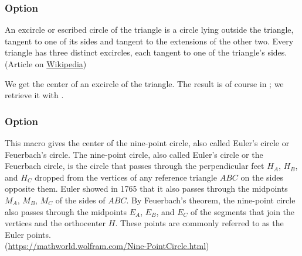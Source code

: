 \begin{tkzexample}[width=0pt,small]
\end{tkzexample}

\subsubsection{Option }
An excircle or escribed circle of the triangle is a circle lying outside the triangle, tangent to one of its sides and tangent to the extensions of the other two. Every triangle has three distinct excircles, each tangent to one of the triangle's sides.\\
(Article on \href{https://en.wikipedia.org/wiki/Incircle_and_excircles_of_a_triangle}{Wikipedia})


 We get the center of an excircle of the triangle. The result is of course in ; we retrieve it with .

\begin{tkzexample}[latex=7cm,small]
\end{tkzexample}

\subsubsection{Option }
This macro gives the center of the nine-point circle, also called Euler's circle or Feuerbach's circle. The nine-point circle, also called Euler's circle or the Feuerbach circle, is the circle that passes through the perpendicular feet $H_A$, $H_B$, and $H_C$ dropped from the vertices of any reference triangle $ABC$ on the sides opposite them. Euler showed in 1765 that it also passes through the midpoints $M_A$, $M_B$, $M_C$ of the sides of $ABC$. By Feuerbach's theorem, the nine-point circle also passes through the midpoints $E_A$, $E_B$, and $E_C$ of the segments that join the vertices and the orthocenter $H$. These points are commonly referred to as the Euler points.\\ (\url{https://mathworld.wolfram.com/Nine-PointCircle.html})

